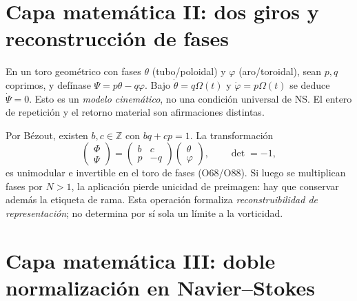 \documentclass[11pt,a4paper]{article}
\theoremstyle{definition}\newtheorem{defi}[teo]{Definición}
\begin{document}
\section{Capa matemática II: dos giros y reconstrucción de fases}
En un toro geométrico con fases $\theta$ (tubo/poloidal) y $\varphi$ (aro/toroidal), sean $p,q$ coprimos, y defínase $\Psi=p\theta-q\varphi$. Bajo $\dot\theta=q\Omega(t)$ y $\dot\varphi=p\Omega(t)$ se deduce $\dot\Psi=0$. Esto es un \emph{modelo cinemático}, no una condición universal de NS. El entero de repetición y el retorno material son afirmaciones distintas.

Por Bézout, existen $b,c\in\mathbb Z$ con $bq+cp=1$. La transformación
\begin{equation}
\begin{pmatrix}\Phi\\\Psi\end{pmatrix}=
\begin{pmatrix}b&c\\p&-q\end{pmatrix}
\begin{pmatrix}\theta\\\varphi\end{pmatrix},\qquad \det=-1,
\end{equation}
es unimodular e invertible en el toro de fases (O68/O88). Si luego se multiplican fases por $N>1$, la aplicación pierde unicidad de preimagen: hay que conservar además la etiqueta de rama. Esta operación formaliza \emph{reconstruibilidad de representación}; no determina por sí sola un límite a la vorticidad.

\section{Capa matemática III: doble normalización en Navier--Stokes}
\end{document}
